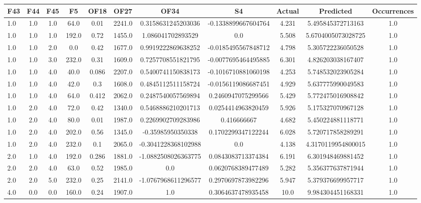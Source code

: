 \clearpage
\begin{table}[htbp]
\centering
\begin{tabular}{|l|c|c|c|c|c|c|c|c|c|c|}
\hline
F43 & F44 & F45 & F5 & OF18 & OF27 & OF34 & S4 & Actual & Predicted & Occurrences \\
\hline
1.0 & 1.0 & 1.0 & 64.0 & 0.01 & 2241.0 & 0.3158631245203036 & -0.1338899667604764 & 4.231 & 5.495845372713163 & 1.0 \\
1.0 & 1.0 & 1.0 & 192.0 & 0.72 & 1455.0 & 1.086041702893529 & 0.0 & 5.508 & 5.6704005073028725 & 1.0 \\
1.0 & 1.0 & 2.0 & 0.0 & 0.42 & 1677.0 & 0.9919222869638252 & -0.0185495567848712 & 4.798 & 5.305722236050528 & 1.0 \\
1.0 & 1.0 & 3.0 & 232.0 & 0.31 & 1609.0 & 0.7257708551821795 & -0.0077695464495885 & 6.301 & 4.826203038167407 & 1.0 \\
1.0 & 1.0 & 4.0 & 40.0 & 0.086 & 2207.0 & 0.5400741150838173 & -0.1016710881060198 & 4.253 & 5.748532023905284 & 1.0 \\
1.0 & 1.0 & 4.0 & 42.0 & 0.3 & 1608.0 & 0.4845112511158724 & -0.0156119086687451 & 4.929 & 5.637775990049583 & 1.0 \\
1.0 & 1.0 & 4.0 & 64.0 & 0.412 & 2062.0 & 0.2487540057569894 & 0.2460947075299566 & 5.429 & 5.772475016908842 & 1.0 \\
1.0 & 2.0 & 4.0 & 72.0 & 0.42 & 1340.0 & 0.5468886210201713 & 0.0254414963820459 & 5.926 & 5.175327070967128 & 1.0 \\
1.0 & 2.0 & 4.0 & 80.0 & 0.01 & 1987.0 & 0.2269902709283986 & 0.416666667 & 4.682 & 5.450224881118771 & 1.0 \\
1.0 & 2.0 & 4.0 & 202.0 & 0.56 & 1345.0 & -0.35985950350338 & 0.1702299347122244 & 6.028 & 5.720717858289291 & 1.0 \\
1.0 & 2.0 & 4.0 & 232.0 & 0.1 & 2065.0 & -0.3041228368102988 & 0.0 & 4.138 & 4.3170119954800015 & 1.0 \\
2.0 & 1.0 & 4.0 & 192.0 & 0.286 & 1881.0 & -1.0882508026363775 & 0.0843083713374384 & 6.191 & 6.301948469881452 & 1.0 \\
2.0 & 2.0 & 4.0 & 63.0 & 0.52 & 1985.0 & 0.0 & 0.0620768389477489 & 5.282 & 5.356377637871944 & 1.0 \\
2.0 & 2.0 & 5.0 & 232.0 & 0.25 & 2141.0 & -1.0767968611296577 & 0.2970697873982296 & 5.947 & 5.379376699957717 & 1.0 \\
4.0 & 0.0 & 0.0 & 160.0 & 0.24 & 1907.0 & 1.0 & 0.3064637478935458 & 10.0 & 9.984304451168331 & 1.0 \\

\end{tabular}
\end{table}
